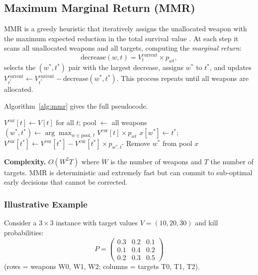 \documentclass[10pt,conference]{IEEEtran}
\begin{document}
\subsection{Maximum Marginal Return (MMR)}
\label{sec:mmr}

MMR is a greedy heuristic that iteratively assigns the unallocated weapon with
the maximum expected reduction in the total survival value \cite{ahuja2007}.
At each step it scans all unallocated weapons and all targets, computing the
\emph{marginal return}:
\[
  \text{decrease}(w, t) = V_t^{\text{current}} \times p_{wt},
\]
selects the $(w^*, t^*)$ pair with the largest decrease, assigns $w^*$ to
$t^*$, and updates $V_{t^*}^{\text{current}} \leftarrow
V_{t^*}^{\text{current}} - \text{decrease}(w^*, t^*)$.
This process repeats until all weapons are allocated.

Algorithm~\ref{alg:mmr} gives the full pseudocode.

\begin{algorithm}[htbp]
  \caption{MMR Greedy Heuristic}
  \label{alg:mmr}
  \begin{algorithmic}[1]
    \State $V^{\text{cur}}[t] \leftarrow V[t]$ for all $t$; pool $\leftarrow$ all weapons
      \State $(w^*, t^*) \leftarrow \arg\max_{w \in \text{pool},\, t} V^{\text{cur}}[t] \times p_{wt}$
      \State $x[w^*] \leftarrow t^*$;\quad $V^{\text{cur}}[t^*] \leftarrow V^{\text{cur}}[t^*] - V^{\text{cur}}[t^*]\times p_{w^*,t^*}$
      \State Remove $w^*$ from pool
    \EndWhile
    \State \Return $x$
  \end{algorithmic}
\end{algorithm}

\textbf{Complexity.} $O(W^2 T)$ where $W$ is the number of weapons and $T$
the number of targets.  MMR is deterministic and extremely fast but can
commit to sub-optimal early decisions that cannot be corrected.

\subsubsection*{Illustrative Example}

Consider a $3 \times 3$ instance with target values
$V = (10, 20, 30)$ and kill probabilities:
\[
  P = \begin{pmatrix}
    0.3 & 0.2 & 0.1 \\
    0.1 & 0.4 & 0.2 \\
    0.2 & 0.3 & 0.5
  \end{pmatrix}
\]
(rows = weapons W0, W1, W2; columns = targets T0, T1, T2).
\end{document}
